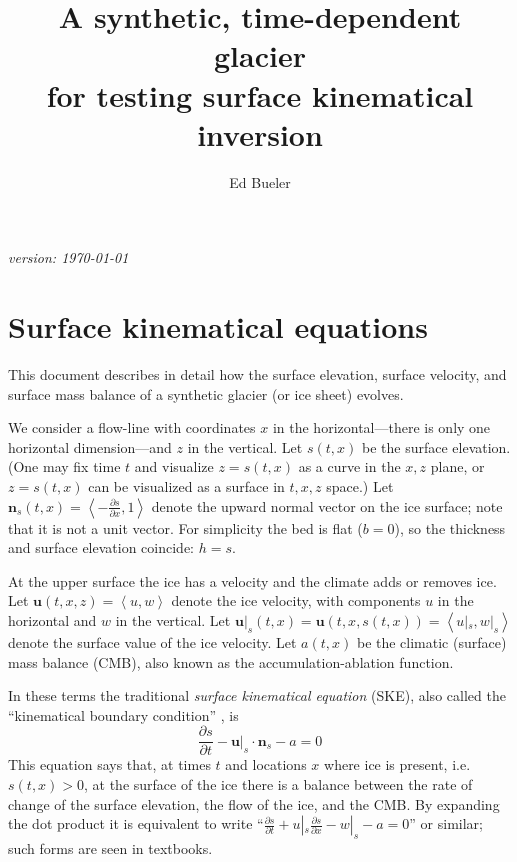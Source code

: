 \documentclass[letterpaper,final,12pt,reqno]{amsart}
\newcommand{\bn}{\mathbf{n}}
\newcommand{\bu}{\mathbf{u}}
\begin{document}

\title[Synthetic, time-dependent glacier]{A synthetic, time-dependent glacier \\ for testing surface kinematical inversion}

\author{Ed Bueler}

\maketitle

\begin{center}
{\footnotesize
\emph{version: \today}}
\end{center}

\thispagestyle{empty}

\section{Surface kinematical equations}  This document describes in detail how the surface elevation, surface velocity, and surface mass balance of a synthetic glacier (or ice sheet) evolves.

We consider a flow-line with coordinates $x$ in the horizontal---there is only one horizontal dimension---and $z$ in the vertical.  Let $s(t,x)$ be the surface elevation.  (One may fix time $t$ and visualize $z=s(t,x)$ as a curve in the $x,z$ plane, or $z=s(t,x)$ can be visualized as a surface in $t,x,z$ space.)  Let $\bn_s(t,x) = \left<-\frac{\partial s}{\partial x},1\right>$ denote the upward normal vector on the ice surface; note that it is not a unit vector.  For simplicity the bed is flat ($b=0$), so the thickness and surface elevation coincide: $h=s$.

At the upper surface the ice has a velocity and the climate adds or removes ice.  Let $\bu(t,x,z)=\left<u,w\right>$ denote the ice velocity, with components $u$ in the horizontal and $w$ in the vertical.  Let $\bu|_s(t,x) = \bu(t,x,s(t,x)) = \left<u|_s,w|_s\right>$ denote the surface value of the ice velocity.  Let $a(t,x)$ be the climatic (surface) mass balance (CMB), also known as the accumulation-ablation function.

In these terms the traditional \emph{surface kinematical equation} (SKE), also called the ``kinematical boundary condition'' \cite{FowlerNg2021,GreveBlatter2009}, is
\begin{equation}
\frac{\partial s}{\partial t} - \bu|_s \cdot \bn_s - a = 0  \label{ske}
\end{equation}
This equation says that, at times $t$ and locations $x$ where ice is present, i.e.~$s(t,x)>0$, at the surface of the ice there is a balance between the rate of change of the surface elevation, the flow of the ice, and the CMB.  By expanding the dot product it is equivalent to write ``$\frac{\partial s}{\partial t} + u|_s \frac{\partial s}{\partial x} - w|_s - a = 0$'' or similar; such forms are seen in textbooks.
\end{document}

